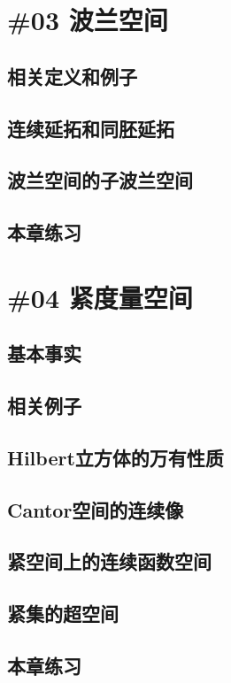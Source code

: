 \section{\#03 波兰空间}
\subsection{相关定义和例子}
\newpage
\subsection{连续延拓和同胚延拓}
\newpage
\subsection{波兰空间的子波兰空间}
\newpage
\subsection{本章练习}
\newpage

\section{\#04 紧度量空间}
\subsection{基本事实}
\newpage
\subsection{相关例子}
\newpage
\subsection{Hilbert立方体的万有性质}
\newpage
\subsection{Cantor空间的连续像}
\newpage
\subsection{紧空间上的连续函数空间}
\newpage
\subsection{紧集的超空间}
\newpage
\subsection{本章练习}
\newpage

